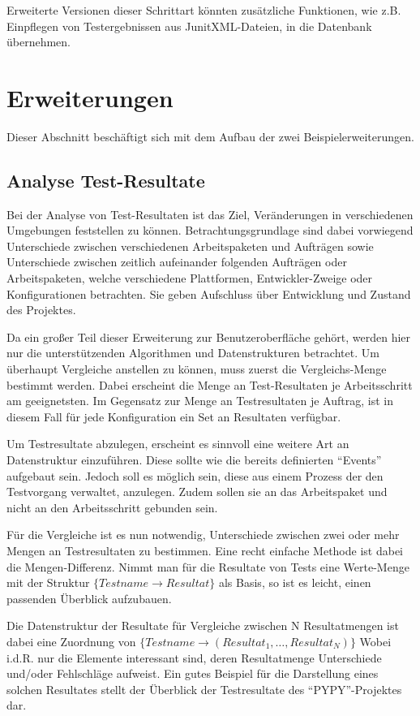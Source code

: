 Erweiterte Versionen dieser Schrittart könnten zusätzliche Funktionen,
wie z.B. Einpflegen von Testergebnissen aus JunitXML-Dateien, in die Datenbank übernehmen.


\section{Erweiterungen}
\label{sec:design:erweiterungen}

Dieser Abschnitt beschäftigt sich mit dem Aufbau der zwei Beispielerweiterungen.

\subsection{Analyse Test-Resultate}

Bei der Analyse von Test-Resultaten ist das Ziel,
Veränderungen in verschiedenen Umgebungen feststellen zu können.
Betrachtungsgrundlage sind dabei vorwiegend Unterschiede zwischen verschiedenen Arbeitspaketen und Aufträgen sowie Unterschiede zwischen zeitlich aufeinander folgenden Aufträgen oder Arbeitspaketen, welche verschiedene Plattformen, Entwickler-Zweige oder Konfigurationen betrachten. Sie geben Aufschluss über Entwicklung und Zustand des Projektes.

Da ein großer Teil dieser Erweiterung zur Benutzeroberfläche gehört,
werden hier nur die unterstützenden Algorithmen und Datenstrukturen betrachtet.
Um überhaupt Vergleiche anstellen zu können, muss zuerst die Vergleichs-Menge bestimmt werden. Dabei erscheint die Menge an Test-Resultaten je Arbeitsschritt am geeignetsten. Im Gegensatz zur Menge an Testresultaten je Auftrag,
ist in diesem Fall für jede Konfiguration ein Set an Resultaten verfügbar.

Um Testresultate abzulegen, erscheint es sinnvoll eine weitere Art an Datenstruktur einzuführen.
Diese sollte wie die bereits definierten ``Events'' aufgebaut sein.
Jedoch soll es möglich sein, diese aus einem Prozess der den Testvorgang verwaltet,
anzulegen. Zudem sollen sie an das Arbeitspaket und nicht an den Arbeitsschritt gebunden sein.

Für die Vergleiche ist es nun notwendig,
Unterschiede zwischen zwei oder mehr Mengen an Testresultaten zu bestimmen.
Eine recht einfache Methode ist dabei die Mengen-Differenz.
Nimmt man für die Resultate von Tests eine Werte-Menge mit der Struktur $\{ Testname \rightarrow Resultat \}$ als Basis,
so ist es leicht, einen passenden Überblick aufzubauen.

Die Datenstruktur der Resultate für Vergleiche zwischen N Resultatmengen
ist dabei eine Zuordnung von
$\{ Testname \rightarrow ( Resultat_{1},\ldots,Resultat_{N})\}$
Wobei i.d.R. nur die Elemente interessant sind,
deren Resultatmenge Unterschiede und/oder Fehlschläge aufweist.
Ein gutes Beispiel für die Darstellung eines solchen Resultates
stellt der Überblick der Testresultate des ``PYPY''-Projektes \cite{pypy:overview} dar.

